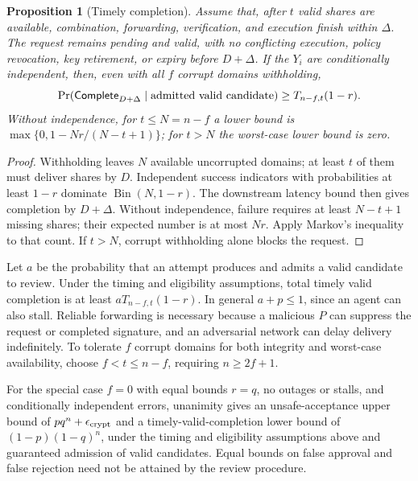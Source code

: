 \documentclass{article}
\newtheorem{proposition}[theorem]{Proposition}
\begin{document}
\begin{samepage}
\begin{proposition}[Timely completion]
\label{prop:availability}
Assume that, after $t$ valid shares are available, combination, forwarding,
verification, and execution finish within $\Delta$. The request remains
pending and valid, with no conflicting execution, policy revocation, key
retirement, or expiry before $D+\Delta$. If the $Y_i$ are conditionally independent,
then, even with all $f$
corrupt domains withholding,
\begin{equation}
 \Pr(\mathsf{Complete}_{D+\Delta}\mid\hbox{admitted valid candidate})
 \ge T_{n-f,t}(1-r).
 \label{eq:availability}
\end{equation}
Without independence, for $t\le N=n-f$ a lower bound is
$\max\{0,1-Nr/(N-t+1)\}$; for $t>N$ the worst-case lower bound is zero.
\end{proposition}
\end{samepage}

\begin{proof}
Withholding leaves $N$ available uncorrupted domains; at least $t$ of them
must deliver shares by $D$. Independent success indicators with probabilities
at least $1-r$ dominate $\operatorname{Bin}(N,1-r)$. The downstream latency
bound then gives completion by $D+\Delta$.
Without independence, failure requires at least $N-t+1$ missing shares;
their expected number is at most $Nr$. Apply Markov's inequality to that count.
If $t>N$, corrupt withholding alone blocks the request.
\end{proof}

Let $a$ be the probability that an attempt produces and admits a valid
candidate to review. Under the timing and eligibility assumptions, total timely valid
completion is at least $aT_{n-f,t}(1-r)$.
In general $a+p\le1$, since an agent can also stall.
Reliable forwarding is necessary because a malicious $P$ can suppress the
request or completed signature, and an adversarial network can delay delivery
indefinitely. To tolerate $f$ corrupt domains for both integrity and
worst-case availability, choose $f<t\le n-f$, requiring $n\ge2f+1$.

For the special case $f=0$ with equal bounds $r=q$, no outages or stalls,
and conditionally independent errors, unanimity gives an unsafe-acceptance
upper bound of $pq^n+\epsilon_{\rm crypt}$ and a timely-valid-completion lower
bound of $(1-p)(1-q)^n$, under the timing and eligibility assumptions above
and guaranteed admission of valid candidates.
Equal bounds on false approval and false rejection need not be attained by
the review procedure.
\end{document}
